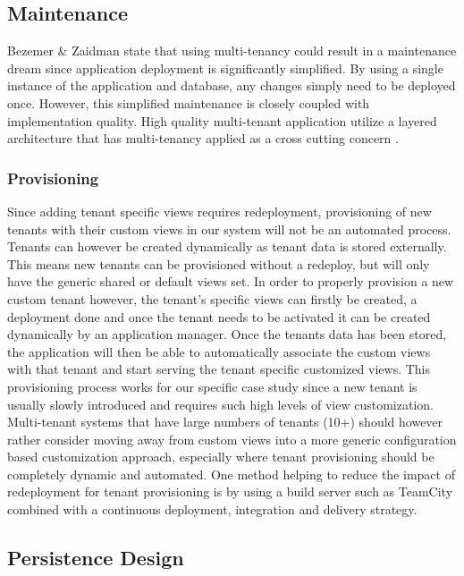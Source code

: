 \subsection{Maintenance}
\label{sec:maintainance}
Bezemer \& Zaidman \cite{Bezemer:2010:MSA:1862372.1862393} state that using multi-tenancy could result in a maintenance dream since application deployment is significantly simplified. By using a single instance of the application and database, any changes simply need to be deployed once. However, this simplified maintenance is closely coupled with implementation quality. High quality multi-tenant application utilize a layered architecture that has multi-tenancy applied as a cross cutting concern \cite{Bezemer:2010:MSA:1862372.1862393}.


\subsubsection{Provisioning}

Since adding tenant specific views requires redeployment, provisioning of new tenants with their custom views in our system will not be an automated process. Tenants can however be created dynamically as tenant data is stored externally. This means new tenants can be provisioned without a redeploy, but will only have the generic shared or default views set. In order to properly provision a new custom tenant however, the tenant's specific views can firstly be created, a deployment done and once the tenant needs to be activated it can be created dynamically by an application manager. Once the tenants data has been stored, the application will then be able to automatically associate the custom views with that tenant and start serving the tenant specific customized views. This provisioning process works for our specific case study since a new tenant is usually slowly introduced and requires such high levels of view customization. Multi-tenant systems that have large numbers of tenants (10+) should however rather consider moving away from custom views into a more generic configuration based customization approach, especially where tenant provisioning should be completely dynamic and automated. One method helping to reduce the impact of redeployment for tenant provisioning is by using a build server such as TeamCity combined with a continuous deployment, integration and delivery strategy.


\subsection{Persistence Design}


